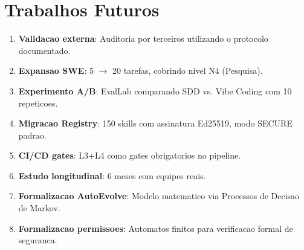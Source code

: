 \documentclass[12pt,a4paper,oneside,sumario=tradicional,chapter=TITLE,section=TITLE,subsection=TITLE,english,brazil]{abntex2}
\begin{document}
\section{Trabalhos Futuros}

\begin{enumerate}[leftmargin=*]
  \item \textbf{Validacao externa}: Auditoria por terceiros utilizando o protocolo documentado.
  \item \textbf{Expansao SWE}: 5 $\to$ 20 tarefas, cobrindo nivel N4 (Pesquisa).
  \item \textbf{Experimento A/B}: EvalLab comparando SDD vs. Vibe Coding com 10 repeticoes.
  \item \textbf{Migracao Registry}: 150 skills com assinatura Ed25519, modo SECURE padrao.
  \item \textbf{CI/CD gates}: L3+L4 como gates obrigatorios no pipeline.
  \item \textbf{Estudo longitudinal}: 6 meses com equipes reais.
  \item \textbf{Formalizacao AutoEvolve}: Modelo matematico via Processos de Decisao de Markov.
  \item \textbf{Formalizacao permissoes}: Automatos finitos para verificacao formal de seguranca.
\end{enumerate}

\cleardoublepage

\end{document}
